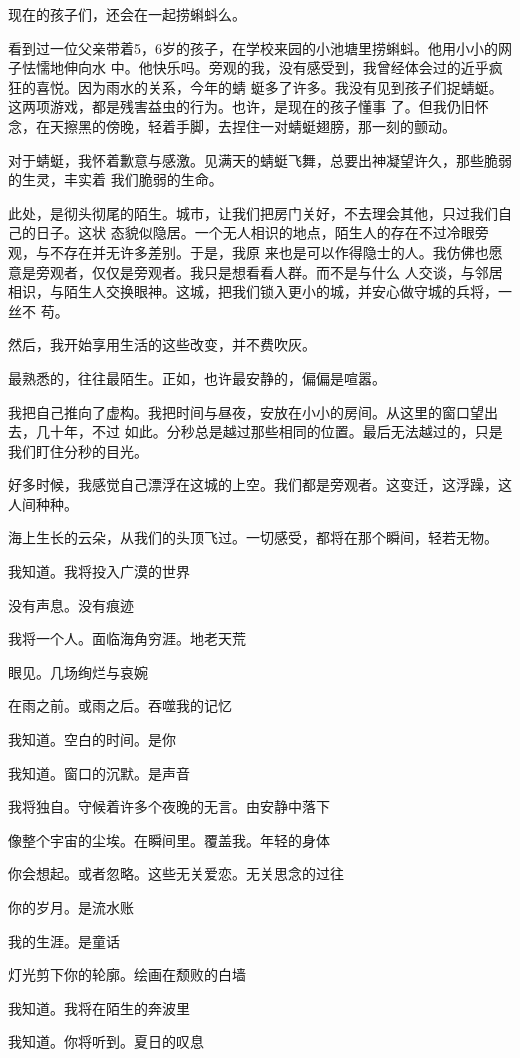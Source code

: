 \documentclass[12pt,a4paper]{article}
\begin{document}
		现在的孩子们，还会在一起捞蝌蚪么。

		看到过一位父亲带着5，6岁的孩子，在学校来园的小池塘里捞蝌蚪。他用小小的网子怯懦地伸向水
	中。他快乐吗。旁观的我，没有感受到，我曾经体会过的近乎疯狂的喜悦。因为雨水的关系，今年的蜻
	蜓多了许多。我没有见到孩子们捉蜻蜓。这两项游戏，都是残害益虫的行为。也许，是现在的孩子懂事
	了。但我仍旧怀念，在天擦黑的傍晚，轻着手脚，去捏住一对蜻蜓翅膀，那一刻的颤动。

		对于蜻蜓，我怀着歉意与感激。见满天的蜻蜓飞舞，总要出神凝望许久，那些脆弱的生灵，丰实着
	我们脆弱的生命。

		此处，是彻头彻尾的陌生。城市，让我们把房门关好，不去理会其他，只过我们自己的日子。这状
	态貌似隐居。一个无人相识的地点，陌生人的存在不过冷眼旁观，与不存在并无许多差别。于是，我原
	来也是可以作得隐士的人。我仿佛也愿意是旁观者，仅仅是旁观者。我只是想看看人群。而不是与什么
	人交谈，与邻居相识，与陌生人交换眼神。这城，把我们锁入更小的城，并安心做守城的兵将，一丝不
	苟。

		然后，我开始享用生活的这些改变，并不费吹灰。

		最熟悉的，往往最陌生。正如，也许最安静的，偏偏是喧嚣。

		我把自己推向了虚构。我把时间与昼夜，安放在小小的房间。从这里的窗口望出去，几十年，不过
	如此。分秒总是越过那些相同的位置。最后无法越过的，只是我们盯住分秒的目光。

		好多时候，我感觉自己漂浮在这城的上空。我们都是旁观者。这变迁，这浮躁，这人间种种。

		海上生长的云朵，从我们的头顶飞过。一切感受，都将在那个瞬间，轻若无物。

	\endwriting



		我知道。我将投入广漠的世界 \par
		没有声息。没有痕迹 \par
		我将一个人。面临海角穷涯。地老天荒 \par
		眼见。几场绚烂与哀婉 \par
		在雨之前。或雨之后。吞噬我的记忆 \par
		我知道。空白的时间。是你 \par
		我知道。窗口的沉默。是声音 \par
		我将独自。守候着许多个夜晚的无言。由安静中落下 \par
		像整个宇宙的尘埃。在瞬间里。覆盖我。年轻的身体 \par
		你会想起。或者忽略。这些无关爱恋。无关思念的过往 \par
		你的岁月。是流水账 \par
		我的生涯。是童话 \par
		灯光剪下你的轮廓。绘画在颓败的白墙 \par
		我知道。我将在陌生的奔波里 \par
		我知道。你将听到。夏日的叹息
\end{document}
